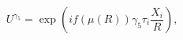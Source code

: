 \begin{equation}
U^{\gamma_5} = \exp \left( i f(\mu(R)) \gamma_5 \tau_i \frac{X_i}{R} 
\right),
\end{equation}

